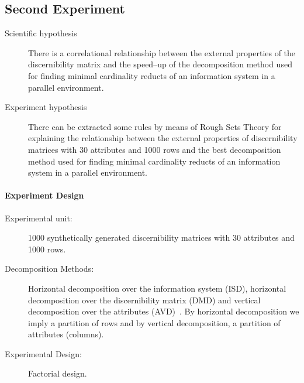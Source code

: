 \documentclass[11pt]{article}   %
\begin{document}
\subsection{Second Experiment}\label{exprimet2}
  \begin{description}
  \item[Scientific hypothesis] There is a correlational relationship between the external properties of the discernibility
  							   matrix and the speed--up of the decomposition method used for finding minimal
  							   cardinality reducts of an information	system in a parallel environment.
  \item[Experiment hypothesis] There can be extracted some rules by means of Rough Sets Theory for explaining
  							   the relationship between the external properties of discernibility matrices
  							   with 30 attributes and 1000 rows and the best decomposition method used for finding
  							   minimal cardinality reducts of an information	system in a parallel environment.
  \end{description}
  \paragraph{Experiment Design} 
	  \begin{description}
	  	\item[Experimental unit:] 1000 synthetically generated discernibility matrices with 30 attributes and
	  							  1000 rows.
	  	\item[Decomposition Methods:] Horizontal decomposition over the information system (ISD), horizontal
	  								 decomposition over the discernibility matrix (DMD) and vertical decomposition 
	  								 over the attributes (AVD)~\cite{Strakowski08}. By horizontal decomposition 
	  								 we imply a partition of rows and by vertical decomposition, a partition of
	  								 attributes (columns).
	  	\item[Experimental Design:] Factorial design.
	  \end{description}
\end{document}
